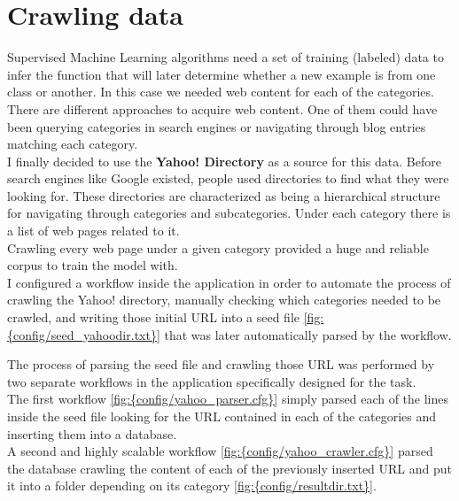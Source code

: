 \section{Crawling data}
Supervised Machine Learning algorithms need a set of training (labeled) data to infer the function that will later determine whether a new example is from one class or another. In this case we needed
web content for each of the categories. There are different approaches to acquire web content. One of them could have been querying categories in search engines or navigating through blog entries matching
each category. \\
I finally decided to use the {\bf Yahoo! Directory}\cite{yahoo} as a source for this data.
Before search engines like Google existed, people used directories to find what they were looking for. These directories are characterized as being a hierarchical structure for navigating through categories
and subcategories. Under each category there is a list of web pages related to it. \\ 
Crawling every web page under a given category provided a huge and reliable corpus to train the model with. \\
I configured a workflow inside the application in order to automate the process of crawling the Yahoo! directory, manually checking which categories needed to be crawled, and writing those initial URL into 
a seed file \ref{fig:{config/seed_yahoodir.txt}} that was later automatically parsed by the workflow.


The process of parsing the seed file and crawling those URL was performed by two separate  workflows in the application specifically designed for the task. \\
The first workflow \ref{fig:{config/yahoo_parser.cfg}} simply parsed each of the lines inside the seed file looking for the URL contained in each of the categories and inserting them into a database. \\
A second and highly scalable workflow \ref{fig:{config/yahoo_crawler.cfg}} parsed the database crawling the content of each of the previously inserted URL and put it into a folder 
depending on its category \ref{fig:{config/resultdir.txt}}. \\


\clearpage
{}


